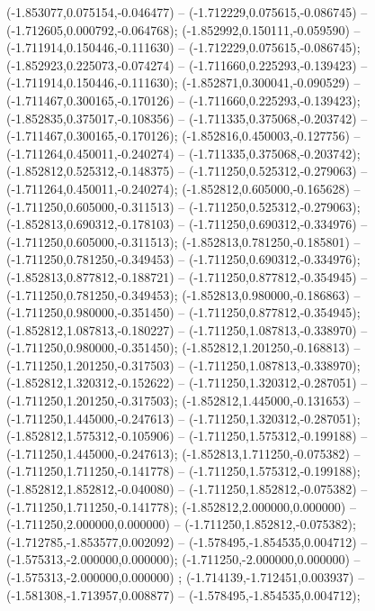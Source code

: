  (-1.853077,0.075154,-0.046477) -- (-1.712229,0.075615,-0.086745) -- (-1.712605,0.000792,-0.064768);
 (-1.852992,0.150111,-0.059590) -- (-1.711914,0.150446,-0.111630) -- (-1.712229,0.075615,-0.086745);
 (-1.852923,0.225073,-0.074274) -- (-1.711660,0.225293,-0.139423) -- (-1.711914,0.150446,-0.111630);
 (-1.852871,0.300041,-0.090529) -- (-1.711467,0.300165,-0.170126) -- (-1.711660,0.225293,-0.139423);
 (-1.852835,0.375017,-0.108356) -- (-1.711335,0.375068,-0.203742) -- (-1.711467,0.300165,-0.170126);
 (-1.852816,0.450003,-0.127756) -- (-1.711264,0.450011,-0.240274) -- (-1.711335,0.375068,-0.203742);
 (-1.852812,0.525312,-0.148375) -- (-1.711250,0.525312,-0.279063) -- (-1.711264,0.450011,-0.240274);
 (-1.852812,0.605000,-0.165628) -- (-1.711250,0.605000,-0.311513) -- (-1.711250,0.525312,-0.279063);
 (-1.852813,0.690312,-0.178103) -- (-1.711250,0.690312,-0.334976) -- (-1.711250,0.605000,-0.311513);
 (-1.852813,0.781250,-0.185801) -- (-1.711250,0.781250,-0.349453) -- (-1.711250,0.690312,-0.334976);
 (-1.852813,0.877812,-0.188721) -- (-1.711250,0.877812,-0.354945) -- (-1.711250,0.781250,-0.349453);
 (-1.852813,0.980000,-0.186863) -- (-1.711250,0.980000,-0.351450) -- (-1.711250,0.877812,-0.354945);
 (-1.852812,1.087813,-0.180227) -- (-1.711250,1.087813,-0.338970) -- (-1.711250,0.980000,-0.351450);
 (-1.852812,1.201250,-0.168813) -- (-1.711250,1.201250,-0.317503) -- (-1.711250,1.087813,-0.338970);
 (-1.852812,1.320312,-0.152622) -- (-1.711250,1.320312,-0.287051) -- (-1.711250,1.201250,-0.317503);
 (-1.852812,1.445000,-0.131653) -- (-1.711250,1.445000,-0.247613) -- (-1.711250,1.320312,-0.287051);
 (-1.852812,1.575312,-0.105906) -- (-1.711250,1.575312,-0.199188) -- (-1.711250,1.445000,-0.247613);
 (-1.852813,1.711250,-0.075382) -- (-1.711250,1.711250,-0.141778) -- (-1.711250,1.575312,-0.199188);
 (-1.852812,1.852812,-0.040080) -- (-1.711250,1.852812,-0.075382) -- (-1.711250,1.711250,-0.141778);
 (-1.852812,2.000000,0.000000) -- (-1.711250,2.000000,0.000000) -- (-1.711250,1.852812,-0.075382);
 (-1.712785,-1.853577,0.002092) -- (-1.578495,-1.854535,0.004712) -- (-1.575313,-2.000000,0.000000);
 (-1.711250,-2.000000,0.000000) -- (-1.575313,-2.000000,0.000000) ;
 (-1.714139,-1.712451,0.003937) -- (-1.581308,-1.713957,0.008877) -- (-1.578495,-1.854535,0.004712);

